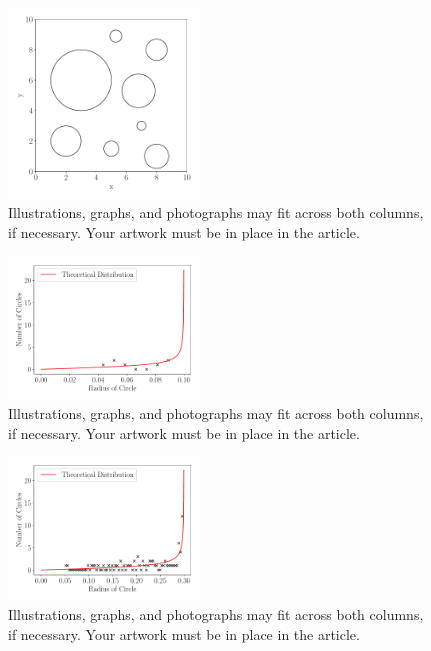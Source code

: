 \documentclass[journal]{IEEEtran}
\begin{document}
\begin{figure}[H]%
\begin{center}
\includegraphics[width=0.45\textwidth]{./../Figures/circles.pdf}
\caption{Illustrations, graphs, and photographs may fit across both columns, if
  necessary. Your artwork must be in place in the article.}
\label{fig:circles}
\end{center}
\end{figure}

\begin{figure}[H]%
\begin{center}
\includegraphics[width=0.45\textwidth]{./../Figures/750_01.pdf}
\caption{Illustrations, graphs, and photographs may fit across both columns, if
  necessary. Your artwork must be in place in the article.}
\label{fig:size1}
\end{center}
\end{figure}

\begin{figure}[H]%
\begin{center}
\includegraphics[width=0.45\textwidth]{./../Figures/750_03.pdf}
\caption{Illustrations, graphs, and photographs may fit across both columns, if
  necessary. Your artwork must be in place in the article.}
\label{fig:size3}
\end{center}
\end{figure}
\end{document}
